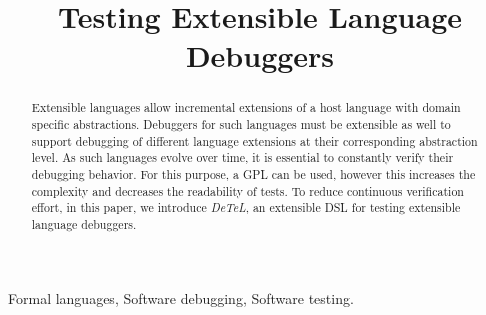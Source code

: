\documentclass[conference]{template/IEEEtran} %
\begin{document}
\title{Testing Extensible Language Debuggers} 

\author{
\and
{}
\and
{}
\and
{}
}

\maketitle

\begin{abstract}
Extensible languages allow incremental extensions of a host
language with domain specific abstractions. Debuggers for such languages must be
extensible as well to support debugging of different language extensions at
their corresponding abstraction level. As such languages evolve over
time, it is essential to constantly verify their debugging behavior.
For this purpose, a \ac{GPL} can be used, however this increases the
complexity and decreases the readability of tests.
To reduce continuous verification effort, in this paper, we introduce 
\emph{DeTeL}, an extensible \ac{DSL} for testing extensible language debuggers.
\end{abstract}

\begin{IEEEkeywords}
Formal languages, Software debugging, Software testing.
\end{IEEEkeywords}
\vspace{-1mm}













\end{document}
